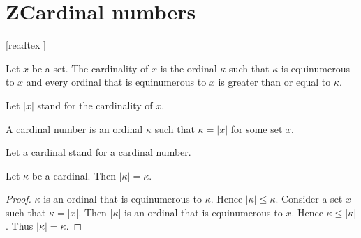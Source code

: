 \documentclass[../set-theory.tex]{subfiles}
\begin{document}
  \chapter{ZCardinal numbers}


  \begin{forthel}

    [readtex ]

  \end{forthel}


  \begin{forthel}
    \begin{definition}
      Let $x$ be a set.
      The cardinality of $x$ is the ordinal $\kappa$ such that $\kappa$ is
      equinumerous to $x$ and every ordinal that is equinumerous to $x$ is
      greater than or equal to $\kappa$.
    \end{definition}

    Let $|x|$ stand for the cardinality of $x$.
  \end{forthel}

  \begin{forthel}
    \begin{definition}
      A cardinal number is an ordinal $\kappa$ such that $\kappa = |x|$ for some
      set $x$.
    \end{definition}

    Let a cardinal stand for a cardinal number.
  \end{forthel}

  \begin{forthel}
    \begin{proposition}
      Let $\kappa$ be a cardinal.
      Then $|\kappa| = \kappa$.
    \end{proposition}
    \begin{proof}
      $\kappa$ is an ordinal that is equinumerous to $\kappa$.
      Hence $|\kappa| \leq \kappa$.
      Consider a set $x$ such that $\kappa = |x|$.
      Then $|\kappa|$ is an ordinal that is equinumerous to $x$.
      Hence $\kappa \leq |\kappa|$.
      Thus $|\kappa| = \kappa$.
    \end{proof}
  \end{forthel}
\end{document}
